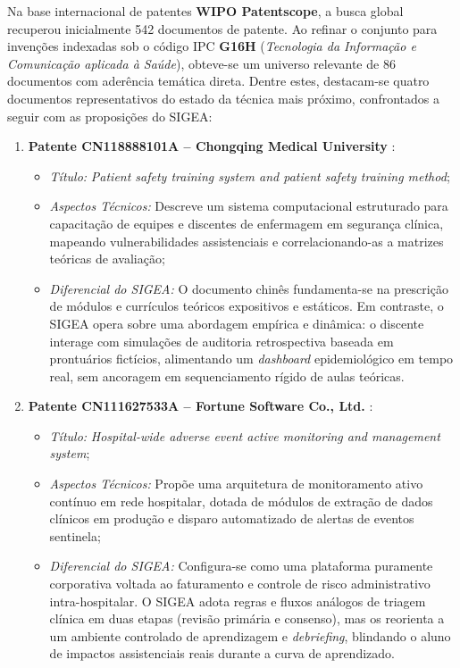 Na base internacional de patentes \textbf{WIPO Patentscope}, a busca global recuperou inicialmente 542 documentos de patente. Ao refinar o conjunto para invenções indexadas sob o código IPC \textbf{G16H} (\textit{Tecnologia da Informação e Comunicação aplicada à Saúde}), obteve-se um universo relevante de 86 documentos com aderência temática direta. Dentre estes, destacam-se quatro documentos representativos do estado da técnica mais próximo, confrontados a seguir com as proposições do SIGEA:

\begin{enumerate}
    \item \textbf{Patente CN118888101A -- Chongqing Medical University} \cite{patente_cn118888101}:
    \begin{itemize}
        \item \textit{Título:} \textit{Patient safety training system and patient safety training method};
        \item \textit{Aspectos Técnicos:} Descreve um sistema computacional estruturado para capacitação de equipes e discentes de enfermagem em segurança clínica, mapeando vulnerabilidades assistenciais e correlacionando-as a matrizes teóricas de avaliação;
        \item \textit{Diferencial do SIGEA:} O documento chinês fundamenta-se na prescrição de módulos e currículos teóricos expositivos e estáticos. Em contraste, o SIGEA opera sobre uma abordagem empírica e dinâmica: o discente interage com simulações de auditoria retrospectiva baseada em prontuários fictícios, alimentando um \textit{dashboard} epidemiológico em tempo real, sem ancoragem em sequenciamento rígido de aulas teóricas.
    \end{itemize}

    \item \textbf{Patente CN111627533A -- Fortune Software Co., Ltd.} \cite{patente_cn111627533}:
    \begin{itemize}
        \item \textit{Título:} \textit{Hospital-wide adverse event active monitoring and management system};
        \item \textit{Aspectos Técnicos:} Propõe uma arquitetura de monitoramento ativo contínuo em rede hospitalar, dotada de módulos de extração de dados clínicos em produção e disparo automatizado de alertas de eventos sentinela;
        \item \textit{Diferencial do SIGEA:} Configura-se como uma plataforma puramente corporativa voltada ao faturamento e controle de risco administrativo intra-hospitalar. O SIGEA adota regras e fluxos análogos de triagem clínica em duas etapas (revisão primária e consenso), mas os reorienta a um ambiente controlado de aprendizagem e \textit{debriefing}, blindando o aluno de impactos assistenciais reais durante a curva de aprendizado.
    \end{itemize}


\end{enumerate}
